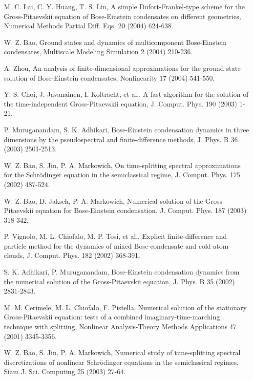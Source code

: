 \documentclass[onecolumn]{elsart3p}
\begin{document}
\begin{thebibliography}{99}
M. C.  	Lai, C. Y. Huang, T. S. Lin, A simple Dufort-Frankel-type
scheme for the Gross-Pitaevskii equation of Bose-Einstein condensates
on different geometries, Numerical Methods  Partial Diff. Eqs. 20
(2004) 624-638.

W. Z.  Bao, Ground states and dynamics of multicomponent Bose-Einstein
condensates, Multiscale Modeling  Simulation 2 (2004) 210-236.

A. 	Zhou,
An analysis of finite-dimensional approximations for the ground state
solution of Bose-Einstein condensates,
Nonlinearity 17 (2004) 541-550.

Y. S. 	Choi, J. Javanainen, I. Koltracht, et al.,
A fast algorithm for the solution of the time-independent
Gross-Pitaevskii equation, J. Comput. Phys.
190 (2003) 1-21.

P. Muruganandam, S. K. Adhikari, Bose-Einstein condensation dynamics
in three dimensions by the pseudospectral and finite-difference
methods, J. Phys. B 36 (2003) 2501-2513.


W. Z. Bao, S. Jin, P. A. Markowich, On time-splitting spectral
approximations
for the Schr\"odinger equation in the semiclassical regime,
J. Comput.
Phys. 175 (2002) 487-524.



W. Z. Bao, D. Jaksch, P. A. Markowich, Numerical solution of the
Gross-Pitaevskii equation for Bose-Einstein condensation, J. Comput.
Phys. 187 (2003) 318-342.

P. Vignolo, M. L. Chiofalo, M. P. Tosi, et al., Explicit
finite-difference and particle method for the dynamics of mixed
Bose-condensate and cold-atom clouds,  J. Comput. Phys. 182
(2002) 368-391.

S. K. Adhikari, P. Muruganandam, Bose-Einstein condensation dynamics
from the numerical solution of the Gross-Pitaevskii equation, J. Phys.
B 35 (2002) 2831-2843.

M. M.  Cerimele, M. L. Chiofalo, F. Pistella, Numerical solution of
the stationary Gross-Pitaevskii equation: tests of a combined
imaginary-time-marching technique with splitting, Nonlinear
Analysis-Theory Methods Applications 47 (2001) 3345-3356.

W. Z. Bao, S. Jin, P. A. Markowich,
Numerical study of time-splitting spectral discretizations of nonlinear
Schr\"odinger equations in the semiclassical regimes,
Siam J.  Sci.
Computing 25 (2003) 27-64.


\end{thebibliography}
\end{document}
